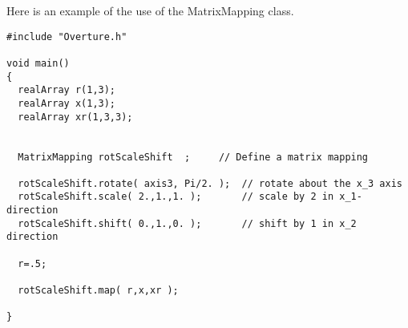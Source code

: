 Here is an example of the use of the {\ff MatrixMapping} class.
{\footnotesize
\begin{verbatim}
#include "Overture.h"

void main()
{
  realArray r(1,3);
  realArray x(1,3);
  realArray xr(1,3,3);


  MatrixMapping rotScaleShift  ;     // Define a matrix mapping 

  rotScaleShift.rotate( axis3, Pi/2. );  // rotate about the x_3 axis
  rotScaleShift.scale( 2.,1.,1. );       // scale by 2 in x_1-direction
  rotScaleShift.shift( 0.,1.,0. );       // shift by 1 in x_2 direction
  
  r=.5;

  rotScaleShift.map( r,x,xr );

}
\end{verbatim}
}


% 
% 

